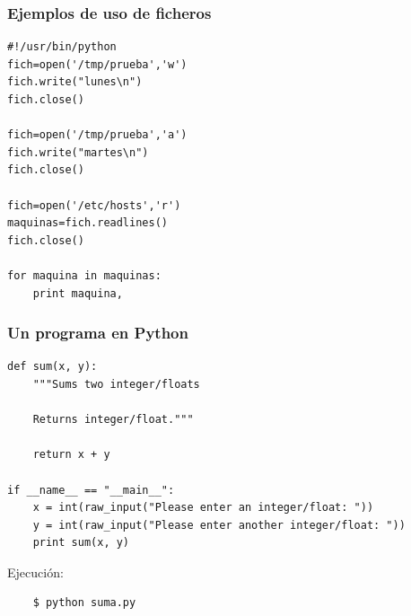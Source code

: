 \documentclass{beamer}
\begin{document}
\begin{frame}[fragile]
\frametitle{Ejemplos de uso de ficheros}

\begin{footnotesize}
\begin{verbatim}
#!/usr/bin/python
fich=open('/tmp/prueba','w')
fich.write("lunes\n")
fich.close()

fich=open('/tmp/prueba','a')
fich.write("martes\n")
fich.close()

fich=open('/etc/hosts','r')
maquinas=fich.readlines()
fich.close()

for maquina in maquinas:
    print maquina,

\end{verbatim}
\end{footnotesize}
\end{frame}



\begin{frame}[fragile]
\frametitle{Un programa en Python}

\begin{footnotesize}
\begin{verbatim}
def sum(x, y):
    """Sums two integer/floats

    Returns integer/float."""

    return x + y

if __name__ == "__main__":
    x = int(raw_input("Please enter an integer/float: "))
    y = int(raw_input("Please enter another integer/float: "))
    print sum(x, y) 

\end{verbatim}
\end{footnotesize}

Ejecución:
\begin{footnotesize}
\begin{verbatim}
    $ python suma.py
\end{verbatim}
\end{footnotesize}
 
\end{frame}
\end{document}
